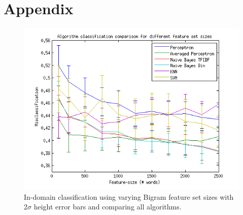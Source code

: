 \chapter{Appendix}
\begin{figure}[H]
\centering
\includegraphics[scale = 0.2]{../Plottar/feature-size100-2500bigram.png}
\caption{In-domain classification using varying Bigram feature set sizes with 2$\sigma$ height error bars and comparing all algorithms.}
\label{fig:trainingsize}
\end{figure} 



